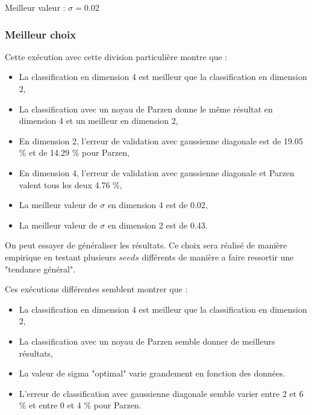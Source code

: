 \documentclass[a4paper,10pt]{article}
\begin{document}
Meilleur valeur : $\sigma = 0.02$

\subsubsection{Meilleur choix}
Cette exécution avec cette division particulière montre que :
\begin{itemize}
	\item La classification en dimension 4 est meilleur que la classification en dimension 2,
	\item La classification avec un noyau de Parzen donne le même résultat en dimension 4 et un meilleur en dimension 2,
	\item En dimension 2, l'erreur de validation avec gaussienne diagonale est de 19.05 \% et de 14.29 \% pour Parzen,
	\item En dimension 4, l'erreur de validation avec gaussienne diagonale et Parzen valent tous les deux 4.76 \%,
	\item La meilleur valeur de $\sigma$ en dimension 4 est de 0.02,
	\item La meilleur valeur de $\sigma$ en dimension 2 est de 0.43.
\end{itemize}
\vspace{5mm}

On peut essayer de généraliser les résultats. Ce choix sera réalisé de manière empirique en testant plusieurs $seeds$ différents de manière a faire ressortir une "tendance général".

Ces exécutions différentes semblent montrer que :
\begin{itemize}
	\item La classification en dimension 4 est meilleur que la classification en dimension 2,
	\item La classification avec un noyau de Parzen semble donner de meilleurs résultats,
	\item La valeur de sigma "optimal" varie grandement en fonction des données.
	\item L'erreur de classification avec gaussienne diagonale semble varier entre 2 et 6 \% et entre 0 et 4 \% pour Parzen.
\end{itemize}
\end{document}
